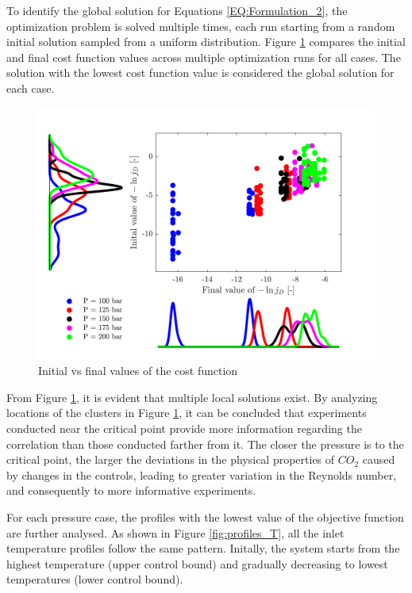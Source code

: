 \documentclass[../Article_Sensitivity_Analsysis.tex]{subfiles}
\begin{document}
	To identify the global solution for Equations \ref{EQ:Formulation_2}, the optimization problem is solved multiple times, each run starting from a random initial solution sampled from a uniform distribution. Figure \ref{fig:scatter} compares the initial and final cost function values across multiple optimization runs for all cases. The solution with the lowest cost function value is considered the global solution for each case.
	
	\begin{figure}[h!]
		\centering
		\includegraphics[width=\columnwidth]{Figures/Results/scatter.png}	
		\caption{Initial vs final values of the cost function}
		\label{fig:scatter}
	\end{figure}
	
	From Figure \ref{fig:scatter}, it is evident that multiple local solutions exist. By analyzing locations of the clusters in Figure \ref{fig:scatter}, it can be concluded that experiments conducted near the critical point provide more information regarding the correlation than those conducted farther from it. The closer the pressure is to the critical point, the larger the deviations in the physical properties of $CO_2$ caused by changes in the controls, leading to greater variation in the Reynolds number, and consequently to more informative experiments.
	
	For each pressure case, the profiles with the lowest value of the objective function are further analysed. As shown in Figure \ref{fig:profiles_T}, all the inlet temperature profiles follow the same pattern. Initally, the system starts from the highest temperature (upper control bound) and gradually decreasing to lowest temperatures (lower control bound).
\end{document}
